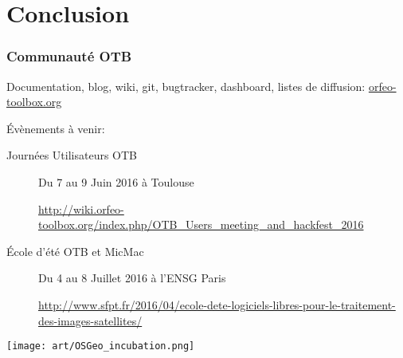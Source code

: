 \documentclass[8pt]{beamer}
\begin{document}
\section*{Conclusion}

\begin{frame}
\frametitle{Communauté OTB}
\begin{center}
Documentation, blog, wiki, git, bugtracker, dashboard, listes de diffusion:
{\huge\textcolor{red}{\href{http://www.orfeo-toolbox.org}{orfeo-toolbox.org}}}
\end{center}

\begin{block}{Évènements à venir:}
\begin{description}
\item[Journées Utilisateurs OTB] {Du 7 au 9 Juin 2016 à Toulouse}
\item[] {{\footnotesize\url{http://wiki.orfeo-toolbox.org/index.php/OTB\_Users\_meeting\_and\_hackfest\_2016}}}
\item[École d’été OTB et MicMac] {Du 4 au 8 Juillet 2016 à l'ENSG Paris}
\item[] {{\footnotesize\url{http://www.sfpt.fr/2016/04/ecole-dete-logiciels-libres-pour-le-traitement-des-images-satellites/}}}
\end{description}
\end{block}
\begin{center}
\texttt{[image: art/OSGeo\_incubation.png]}
\end{center}
\end{frame}
\end{document}
